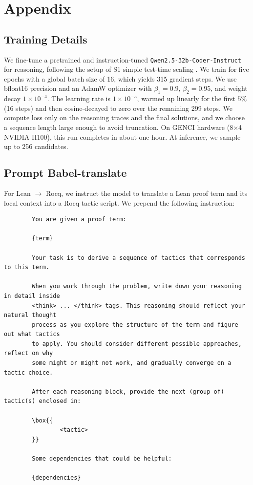 \documentclass{article}
\theoremstyle{plain}
\theoremstyle{definition}
\theoremstyle{remark}
\begin{document}
	\newpage
	\appendix
	\onecolumn
	
	
	\section{Appendix}
	
	
	\subsection{Training Details}
	\label{app:training}
	We fine-tune a pretrained and instruction-tuned \texttt{Qwen2.5-32b-Coder-Instruct}\cite{deepseek2024} for reasoning, following the setup of S1 simple test-time scaling \cite{s12025}. We train for five epochs with a global batch size of 16, which yields 315 gradient steps. We use bfloat16 precision and an AdamW optimizer with $\beta_1=0.9$, $\beta_2=0.95$, and weight decay $1\times 10^{-4}$. The learning rate is $1\times 10^{-5}$, warmed up linearly for the first $5\%$ (16 steps) and then cosine-decayed to zero over the remaining 299 steps. We compute loss only on the reasoning traces and the final solutions, and we choose a sequence length large enough to avoid truncation. On GENCI hardware (8$\times$4 NVIDIA H100), this run completes in about one hour.
	At inference, we sample up to 256 candidates.
	
	
	\subsection{Prompt Babel-translate}
	\label{app:promptbabel}
	For Lean $\to$ Rocq, we instruct the model to translate a Lean
        proof term and its local context into a Rocq tactic script. We
        prepend the following instruction:

        \begin{small}
	\begin{verbatim}
		You are given a proof term:
		
		{term}
		
		Your task is to derive a sequence of tactics that corresponds to this term.
		
		When you work through the problem, write down your reasoning in detail inside
		<think> ... </think> tags. This reasoning should reflect your natural thought
		process as you explore the structure of the term and figure out what tactics
		to apply. You should consider different possible approaches, reflect on why 
		some might or might not work, and gradually converge on a tactic choice.
		
		After each reasoning block, provide the next (group of) tactic(s) enclosed in:
		
		\box{{
				<tactic>
		}}
		
		Some dependencies that could be helpful:
		
		{dependencies}
    \end{verbatim}
         \end{small}
\end{document}
